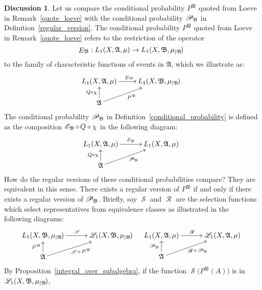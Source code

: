 \documentclass[
twoside=true,
paper=letter,
fontsize=9pt,
pagesize=auto,
leqno,
openany,
headsepline,
overfullrule,
]{scrbook}
\theoremstyle{plain}
\theoremstyle{plain}
\theoremstyle{definition}
\newtheorem{discussion}[thm]{Discussion}
\theoremstyle{bfnoteitalic}
\theoremstyle{bfnoteroman}
\newcommand{\sigalg}[1]{\mathfrak{#1}}
\newcommand{\cali}[1]{\mathscr{#1}}
\newcommand{\kondexpop}{\mathop{E}}
\newcommand{\condexpop}[1]{\mathop{\cali{E}\hspace{-1pt}}\nolimits_{#1}}
\newcommand{\condprobop}[1]{\mathop{\cali{P}\hspace{-1pt}}\nolimits_{#1}}
\newcommand{\restrictedto}[1]{_{\lvert#1}\kern-1.5pt}
\newcommand{\sigmaalgebra}{\sigalg{A}}
\newcommand{\sigmaalgebraii}{\sigalg{B}}
\newcommand{\Lone}{L_1(\measurespace, \sigmaalgebra, \measure)}
\newcommand{\caliLone}{\cali{L}_1(\measurespace, \sigmaalgebra, \measure)}
\newcommand{\measurespace}{X}
\newcommand{\measure}{\mu}
\newcommand{\seti}{A}
\newcommand{\regular}{\mathop{\cali{R}}}
\newcommand{\selection}{\mathop{\cali{S}}}
\begin{document}
\begin{discussion}\label{regular_version_equivalence}
Let us compare the conditional probability $P^{\sigalg{B}}$ quoted from Loeve in Remark~\ref{quote_loeve} with the conditional probability $\condprobop{\sigmaalgebraii}$ in Definition~\ref{regular_version}.  The conditional probability
$P^{\sigalg{B}}$ quoted from Loeve in Remark~\ref{quote_loeve} refers to the restriction of the operator
\[
\kondexpop\nolimits_{\sigmaalgebraii}
:
L_1(\measurespace, \sigmaalgebra,\measure) \to
L_1(\measurespace, \sigmaalgebraii,\measure\restrictedto{\sigmaalgebraii})
\]
to the family of characteristic functions of events in $\sigmaalgebra$, which we illustrate as:
\[
\xymatrix@R=16pt{
L_1(\measurespace, \sigmaalgebra,\measure )
\ar[r]^{\kondexpop\nolimits_{\sigmaalgebraii}}
&
L_1(\measurespace, \sigmaalgebraii,\measure\restrictedto{\sigmaalgebraii})
\\
\sigmaalgebra
\ar[u]^{Q\circ\chi}
\ar[ur]_{P^{\sigalg{B}}}
}
\]
The conditional probability $\condprobop{\sigmaalgebraii}$ in Definition~\ref{conditional_probability} is defined as the composition
$\condexpop{\sigmaalgebraii} \circ\, Q \circ\chi$
in the following diagram:
\[
\xymatrix@R=16pt@C=30pt{
\Lone \ar[r]^{\condexpop{\sigmaalgebraii}} & \Lone\\
\sigmaalgebra \ar[u]^{Q\circ\chi} \ar[ur]_{\condprobop{\sigmaalgebraii}} & \\
}
\]
How do the regular versions of these  conditional probabilities compare? They are equivalent in this sense.
There exists a regular version of
$P^{\sigalg{B}}$ if and only if there exists a regular version of
$\condprobop{\sigmaalgebraii}$.
Briefly, say $\selection$ and $\regular$ are the selection functions which select representatives from equivalence classes as  illustrated in the following diagrams:
\[
\xymatrix@R=16pt@C=30pt{
L_1(\measurespace, \sigmaalgebraii,\measure\restrictedto{\sigmaalgebraii})
\ar[r]^{\selection}
& \cali{L}_1(\measurespace, \sigmaalgebraii,\measure\restrictedto{\sigmaalgebraii})
\\
\sigmaalgebra
\ar[u]^{P^{\sigmaalgebraii}}
\ar[ur]_{\selection \circ \mathop{P^{\sigmaalgebraii}}}
&
}
\quad
\xymatrix@R=16pt@C=30pt{
\Lone \ar[r]^{\regular}
& \caliLone
\\
\sigmaalgebra
\ar[u]^{\condprobop{\sigmaalgebraii}}
\ar[ur]_{\ \regular\circ\condprobop{\sigmaalgebraii}}
&
}
\]
By Proposition~\ref{integral_over_subalgebra}, if the function
$\selection \bigl( P^\sigmaalgebraii (\seti) \bigr)$
is in
$\cali{L}_1(\measurespace, \sigmaalgebraii,\measure\restrictedto{\sigmaalgebraii})$,

\end{discussion}
\end{document}
